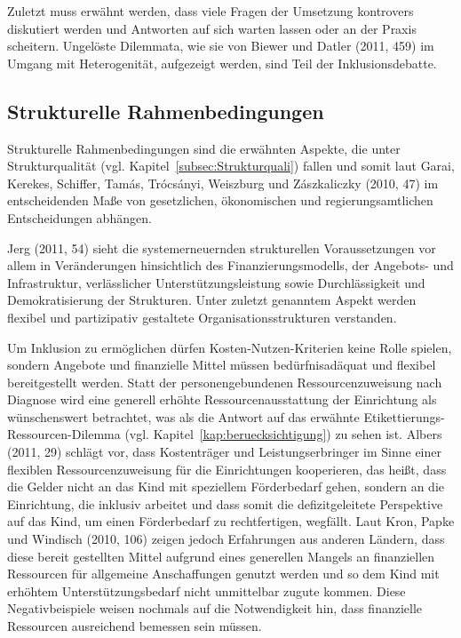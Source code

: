 Zuletzt muss erwähnt werden, dass viele Fragen der Umsetzung kontrovers diskutiert werden und Antworten auf sich warten lassen oder an der Praxis scheitern. Ungelöste Dilemmata, wie sie von Biewer und Datler (2011, 459) im Umgang mit Heterogenität, aufgezeigt werden, sind Teil der Inklusionsdebatte. 

\subsection{Strukturelle Rahmenbedingungen}\label{Strukturelle Rahmenbedingungen}

Strukturelle Rahmenbedingungen sind die erwähnten Aspekte, die unter Strukturqualität (vgl. Kapitel~\ref{subsec:Strukturquali}) fallen und somit laut Garai, Kerekes, Schiffer, Tamás, Trócsányi, Weiszburg und Zászkaliczky (2010, 47) im entscheidenden Maße von gesetzlichen, ökonomischen und regierungsamtlichen Entscheidungen abhängen.

Jerg (2011, 54) sieht die systemerneuernden strukturellen Voraussetzungen vor allem in Veränderungen hinsichtlich des Finanzierungsmodells, der Angebots- und Infrastruktur, verlässlicher Unterstützungsleistung sowie Durchlässigkeit und Demokratisierung der Strukturen. Unter zuletzt genanntem Aspekt werden flexibel und partizipativ gestaltete Organisationsstrukturen verstanden. 

Um Inklusion zu ermöglichen dürfen Kosten-Nutzen-Kriterien keine Rolle spielen, sondern Angebote und finanzielle Mittel müssen bedürfnisadäquat und flexibel bereitgestellt werden. Statt der personengebundenen Ressourcenzuweisung nach Diagnose wird eine generell erhöhte Ressourcenausstattung der Einrichtung als wünschenswert betrachtet, was als die Antwort auf das erwähnte Etikettierungs-Ressourcen-Dilemma (vgl. Kapitel~\ref{kap:beruecksichtigung}) zu sehen ist. 
Albers (2011, 29) schlägt vor, dass Kostenträger und Leistungserbringer im Sinne einer flexiblen Ressourcenzuweisung für die Einrichtungen kooperieren, das heißt, dass die Gelder nicht an das Kind mit speziellem Förderbedarf gehen, sondern an die Einrichtung, die inklusiv arbeitet und dass somit die defizitgeleitete Perspektive auf das Kind, um einen Förderbedarf zu rechtfertigen, wegfällt. Laut Kron, Papke und Windisch (2010, 106) zeigen jedoch Erfahrungen aus anderen Ländern, dass diese bereit gestellten Mittel aufgrund eines generellen Mangels an finanziellen Ressourcen für allgemeine Anschaffungen genutzt werden und so dem Kind mit erhöhtem Unterstützungsbedarf nicht unmittelbar zugute kommen. Diese Negativbeispiele weisen nochmals auf die Notwendigkeit hin, dass finanzielle Ressourcen ausreichend bemessen sein müssen.

